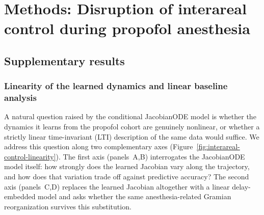 
\chapter{Methods: Disruption of interareal control during propofol anesthesia}
\label{chap:interareal-control-appendix}

\section{Supplementary results}\label{supp:interareal-control-results}

\subsection{Linearity of the learned dynamics and linear baseline analysis}\label{supp:interareal-control-linearity}

A natural question raised by the conditional JacobianODE model is whether the dynamics it learns from the propofol cohort are genuinely nonlinear, or whether a strictly linear time-invariant (LTI) description of the same data would suffice. We address this question along two complementary axes (Figure~\ref{fig:interareal-control-linearity}). The first axis (panels~A,B) interrogates the JacobianODE model itself: how strongly does the learned Jacobian vary along the trajectory, and how does that variation trade off against predictive accuracy? The second axis (panels~C,D) replaces the learned Jacobian altogether with a linear delay-embedded model and asks whether the same anesthesia-related Gramian reorganization survives this substitution.

